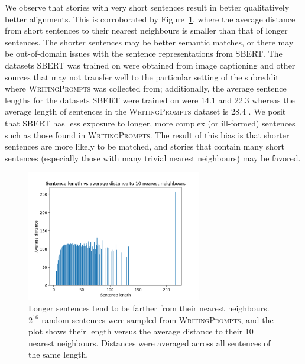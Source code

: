\documentclass{article}
\begin{document}

We observe that stories with very short sentences result in better qualitatively better alignments.
This is corroborated by Figure~\ref{fig:len-v-dist}, where the average distance
from short sentences to their nearest neighbours is smaller than that of longer sentences.
The shorter sentences may be better semantic matches,
or there may be out-of-domain issues with the sentence representations from SBERT.
The datasets SBERT was trained on were obtained from image captioning and other sources
that may not transfer well to the particular setting of the subreddit where
\textsc{WritingPrompts} was collected from;
additionally, the average sentence lengths for the datasets SBERT were trained on were 
14.1 and 22.3 \citep{bowman2015snli,williams2017mnli}
whereas the average length of sentences in the \textsc{WritingPrompts}
dataset is 28.4 \citep{fan2018writingprompts}.
We posit that SBERT has less exposure to longer, more complex (or ill-formed) sentences
such as those found in \textsc{WritingPrompts}.
The result of this bias is that shorter sentences are more likely to be matched,
and stories that contain many short sentences (especially those with many trivial nearest neighbours)
may be favored.
\begin{figure}[h]
\centering
\includegraphics[width=3in]{img/senlen-v-nn-dist.png}
\caption{
\label{fig:len-v-dist}
Longer sentences tend to be farther from their nearest neighbours.
$2^{16}$ random sentences were sampled from \textsc{WritingPrompts},
and the plot shows their length versus the average distance to their 10 nearest neighbours.
Distances were averaged across all sentences of the same length.
}
\end{figure}
\end{document}
